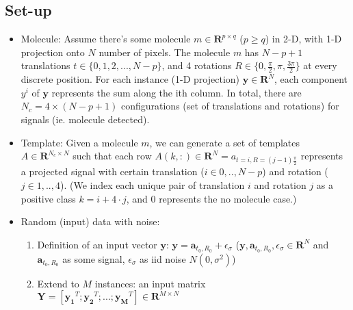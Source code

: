 \documentclass[11pt]{article}
\begin{document}
\subsection{Set-up}
\begin{itemize}
    \item Molecule: Assume there's some molecule $m \in \mathbf{R}^{p \times q}$ ($p\ge q$) in 2-D, with 1-D projection onto $N$ number of pixels. The molecule $m$ has $N-p+1$ translations $t \in \{0,1,2,...,N-p\}$, and 4 rotations $R \in \{0, \frac{\pi}{2}, \pi, \frac{3\pi}{2}\}$ at every discrete position. For each instance (1-D projection) $\mathbf{y} \in \mathbf{R}^N$, each component $y^i$ of $\mathbf{y}$ represents the sum along the ith column. In total, there are $N_c = 4\times(N-p+1)$ configurations (set of translations and rotations) for signals (ie. molecule detected). 
    \item Template: Given a molecule $m$, we can generate a set of templates $A \in \mathbf{R}^{N_c \times N}$ such that each row $A(k,:) \in \mathbf{R}^N = a_{t=i, R=(j-1)\frac{\pi}{2}}$ represents a projected signal with certain translation ($i \in {0,..,N-p}$) and rotation ($j \in {1,..,4}$). (We index each unique pair of translation $i$ and rotation $j$ as a positive class $k=i+4\cdot j$, and $0$ represents the no molecule case.)
    \item Random (input) data with noise:
    \begin{enumerate}
        \item Definition of an input vector $\mathbf{y}$: $\mathbf{y} =  \mathbf{a}_{t_0,R_0} + \epsilon_\sigma$ ($\mathbf{y}, \mathbf{a}_{t_0,R_0}, \epsilon_\sigma \in \mathbf{R}^N$ and $ \mathbf{a}_{t_0,R_0}$ as some signal, $\epsilon_\sigma$ as iid noise $N(0, \sigma^2)$)
        \item Extend to $M$ instances: an input matrix $\mathbf{Y} = [\mathbf{y_1}^T; \mathbf{y_2}^T; ...; \mathbf{y_M}^T] \in \mathbf{R}^{M\times N}$
    \end{enumerate}
    \end{itemize}
    
\end{document}
